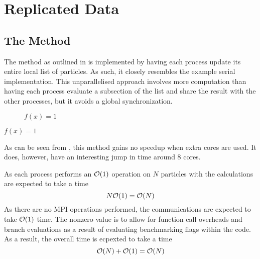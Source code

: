 \section{Replicated Data}
\label{sec:replicated_data_implementation}

%
%

\subsection{The \individualoperation{} Method}
\label{sec:replicated_data_individual_operation_implementation}

The \individualoperation{} method as outlined in
is implemented by having each process update
its entire local list of particles.
%
As such, it closely resembles the example serial implementation.
%
This unparallelised approach involves more computation than
having each process evaluate a subsection of the list and
share the result with the other processes,
but it avoids a global synchronization.


%

%
%
\begin{figure}[!h]
    
    \caption{
        \vZeroSpeedupCaption
            {\replicateddata{}}
            {\individualoperation{}}
            {$f(x) = 1$}
    }
    \label{fig:v0_replicated_data_individual_operation_speedups}
\end{figure}


\vZeroSpeedupExplanation
    {}
    {\replicateddata{}}
    {\individualoperation{}}
    {$f(x) = 1$}

As can be seen from 
,
this method gains no speedup when extra cores are used.
%
It does, however, have an interesting jump in time around 8 cores.


%
As each process performs an $\mathcal{O}{\left({ 1 }\right)}$ operation on $N$ particles with
the calculations are expected to take a time
\begin{equation}
\label{eqn:v0_replicated_individual_operation_overall_time}
    N\mathcal{O}{\left({ 1 }\right)} = \mathcal{O}{\left({ N }\right)}
\end  {equation}
%
As there are no MPI operations performed, the communications are
expected to take $\mathcal{O}{\left({ 1 }\right)}$ time.
%
The nonzero value is to allow for function call overheads and
branch evaluations as a result of evaluating benchmarking flags
within the code.
%
As a result, the overall time is ecpexted to take a time
\begin{equation}
    \mathcal{O}{\left({ N }\right)} + \mathcal{O}{\left({ 1 }\right)} = \mathcal{O}{\left({ N }\right)}
\end{equation}


